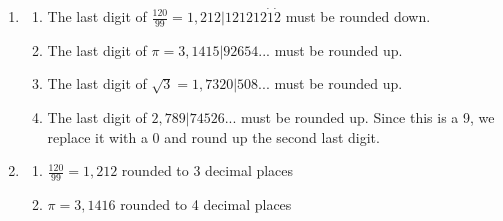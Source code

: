 {\begin{mdframed}[linewidth=4, leftmargin=40, rightmargin=40]
\begin{exercise}
\begin{enumerate}[noitemsep, label=\textbf{Step} \textbf{\arabic*}. ]
\begin{enumerate}[noitemsep, label=\textbf{\alph*}. ]
          \begin{math}\frac{120}{99}=1,212|121212\dot{1}\dot{2}\end{math}
        \label{m38349*uid9}\item 
          \begin{math}\pi =3,1415|92654...\end{math}
        \label{m38349*uid10}\item 
          \begin{math}\sqrt{3}=1,7320|508...\end{math}
        \item \begin{math}2,789|74526...\end{math}\end{enumerate}
      \item  
      \label{m38349*id325490}\begin{enumerate}[noitemsep, label=\textbf{\alph*}. ] 
            \leftskip=20pt\rightskip=\leftskip\label{m38349*uid11}\item The last digit of \begin{math}\frac{120}{99}=1,212|121212\dot{1}\dot{2}\end{math}  must be rounded down.
\label{m38349*uid12}\item The last digit of \begin{math}\pi =3,1415|92654...\end{math} must be rounded up.
\label{m38349*uid13}\item The last digit of \begin{math}\sqrt{3}=1,7320|508...\end{math} must be rounded up.
\item  The last digit of \begin{math}2,789|74526...\end{math} must be rounded up. Since this is a 9, we replace it with a 0 and round up the second last digit.\end{enumerate}
      \item  
      \label{m38349*id325626}\begin{enumerate}[noitemsep, label=\textbf{\alph*}. ] 
            \leftskip=20pt\rightskip=\leftskip\label{m38349*uid14}\item \begin{math}\frac{120}{99}=1,212\end{math} rounded to 3 decimal places
\label{m38349*uid15}\item \begin{math}\pi =3,1416\end{math}  rounded to 4 decimal places

\end{enumerate}
\end{enumerate}
\end{exercise}
\end{mdframed}}
